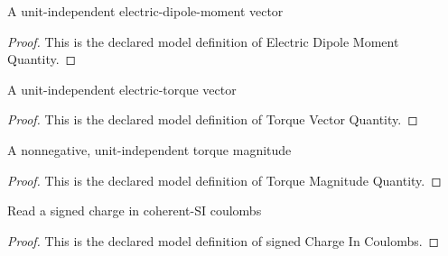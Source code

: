 \begin{definition}
  \label{def:physics:phyx-mini-0996:phyxminiproblems-problemphyxmini0996-electricdipolemomentquantity}
  A unit-independent electric-dipole-moment vector
\end{definition}
\begin{proof}
  This is the declared model definition of Electric Dipole Moment Quantity.
\end{proof}
\begin{definition}
  \label{def:physics:phyx-mini-0996:phyxminiproblems-problemphyxmini0996-torquevectorquantity}
  A unit-independent electric-torque vector
\end{definition}
\begin{proof}
  This is the declared model definition of Torque Vector Quantity.
\end{proof}
\begin{definition}
  \label{def:physics:phyx-mini-0996:phyxminiproblems-problemphyxmini0996-torquemagnitudequantity}
  A nonnegative, unit-independent torque magnitude
\end{definition}
\begin{proof}
  This is the declared model definition of Torque Magnitude Quantity.
\end{proof}
\begin{definition}
  \label{def:physics:phyx-mini-0996:phyxminiproblems-problemphyxmini0996-signedchargeincoulombs}
  Read a signed charge in coherent-SI coulombs
\end{definition}
\begin{proof}
  This is the declared model definition of signed Charge In Coulombs.
\end{proof}
